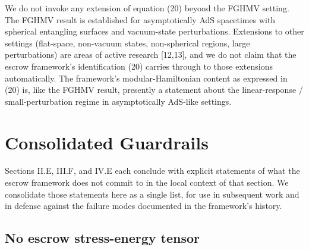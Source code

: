 \documentclass[11pt]{article}
\begin{document}
We do not invoke any extension of equation (20) beyond the FGHMV
setting. The FGHMV result is established for asymptotically AdS
spacetimes with spherical entangling surfaces and vacuum-state
perturbations. Extensions to other settings (flat-space, non-vacuum
states, non-spherical regions, large perturbations) are areas of active
research [12,13], and we do not claim that the escrow framework's
identification (20) carries through to those extensions automatically.
The framework's modular-Hamiltonian content as expressed in (20) is,
like the FGHMV result, presently a statement about the linear-response /
small-perturbation regime in asymptotically AdS-like settings.


\section{Consolidated Guardrails}

Sections II.E, III.F, and IV.E each conclude with explicit statements of
what the escrow framework does not commit to in the local context of
that section. We consolidate those statements here as a single list, for
use in subsequent work and in defense against the failure modes
documented in the framework's history.


\subsection{No escrow stress-energy tensor}
\end{document}
